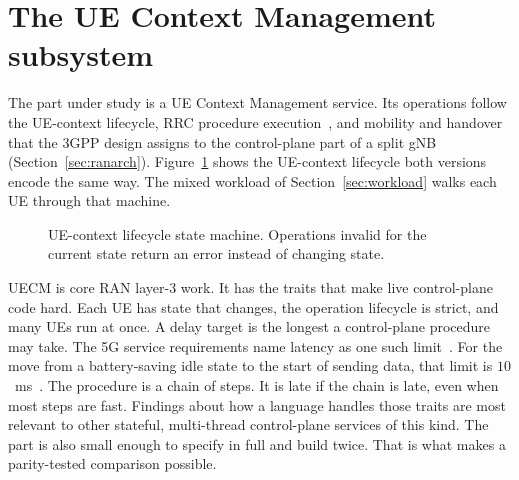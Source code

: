 \documentclass[english,oneside,a4paper,censored,csm,software-track-2020]{HYthesisML}
\begin{document}
\section{The UE Context Management subsystem}\label{sec:uecm}
The part under study is a UE Context Management service. Its operations follow the
UE-context lifecycle, RRC procedure execution~\cite{3gpp38331}, and mobility and
handover that the 3GPP design assigns to the control-plane part of a split gNB
(Section~\ref{sec:ranarch}). Figure~\ref{fig:fsm} shows the UE-context
lifecycle both versions encode the same way. The mixed workload of
Section~\ref{sec:workload} walks each UE through that machine.

\begin{figure}[ht]
\centering
{}
\caption[UE-context lifecycle state machine]{UE-context lifecycle state machine.
Operations invalid for the current state return an error instead of changing
state.\label{fig:fsm}}
\end{figure}

UECM is core RAN layer-3 work. It has the traits that make live control-plane
code hard. Each UE has state that changes, the operation lifecycle is strict,
and many UEs run at once. A delay target is the longest a control-plane procedure may take.
The 5G service requirements name latency as one such limit~\cite{3gpp22261}.
For the move from a battery-saving idle state to the start of sending data, that limit is $10$~ms~\cite{3gpp38913}.
The procedure is a chain of steps. It is late if the chain is late, even when most steps are fast.
Findings about how a language
handles those traits are most relevant to other stateful, multi-thread
control-plane services of this kind. The part is also small enough to specify in full and build twice.
That is what makes a parity-tested comparison possible.
\end{document}
